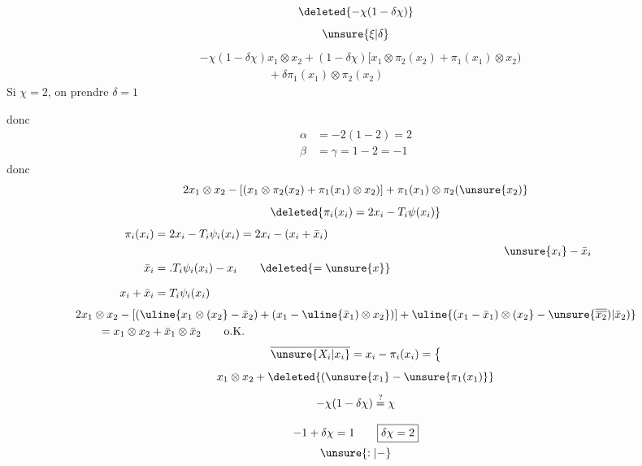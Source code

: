 \[\deleted{-\chi(1-\delta\chi)}\]
\[\unsure{\xi|\delta}\]
\[
\boxed{\begin{aligned}
&-\chi(1-\delta\chi)x_1\otimes x_2+(1-\delta\chi)[x_1\otimes\pi_2(x_2)+\pi_1(x_1)\otimes x_2)\\
&\hspace{6em}+\delta\pi_1(x_1)\otimes\pi_2(x_2)
\end{aligned}}
\]
Si \(\chi=2\), on  prendre \(\delta=1\)

donc
\[
\begin{aligned}
\alpha&=-2(1-2)=2\\
\beta&=\gamma=1-2=-1
\end{aligned}
\]
donc
\[
2x_1\otimes x_2-[(x_1\otimes\pi_2(x_2)+\pi_1(x_1)\otimes x_2)]+\pi_1(x_1)\otimes\pi_2(\unsure{x_2)}
\]
\[\deleted{\pi_i(x_i)=2x_i-T_i\psi(x_i)}\]
\[
\begin{aligned}
\pi_i(x_i)&=2x_i-T_i\psi_i(x_i)=2x_i-(x_i+\bar x_i)\\
&&\hspace{9em}\unsure{x_i}-\bar x_i\\
\bar x_i&=.T_i\psi_i(x_i)-x_i\qquad\deleted{=\unsure{x}}\\[.7em]
x_i+\bar x_i&=T_i\psi_i(x_i)
\end{aligned}
\]
\[
\begin{aligned}
&2x_1\otimes x_2-[(\uline{x_1\otimes(x_2}-\bar x_2)+(x_1-\uline{\bar x_1)\otimes x_2})]
+\uline{(x_1-\bar x_1)\otimes(x_2}-\unsure{\overline{\overline{x_2}})|\bar x_2)}\\
&\qquad=x_1\otimes x_2+\bar x_1\otimes\bar x_2\qquad\text{o.K.}
\end{aligned}
\]
\[
\overline{\unsure{X_i|x_i}}=x_i-\pi_i(x_i)=\bigl\{
\]
\[
x_1\otimes x_2+\deleted{(\unsure{x_1}-\unsure{\pi_1(x_1)}}
\]
\[
\begin{gathered}
-\chi(1-\delta\chi)\overset{?}{=}\chi\\[.8em]
-1+\delta\chi=1\qquad\boxed{\delta\chi=2}\\
\unsure{:|-}
\end{gathered}
\]


